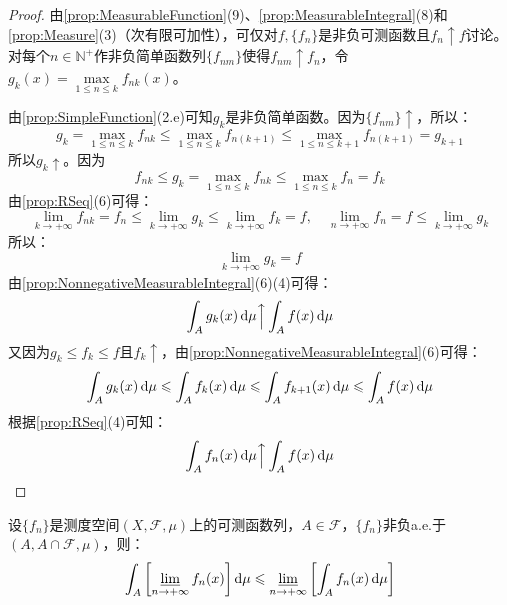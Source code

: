 \begin{proof}
	由\cref{prop:MeasurableFunction}(9)、\cref{prop:MeasurableIntegral}(8)和\cref{prop:Measure}(3)（次有限可加性），可仅对$f,\{f_n\}$是非负可测函数且$f_n\uparrow f$讨论。对每个$n\in\mathbb{N}^+$作非负简单函数列$\{f_{nm}\}$使得$f_{nm}\uparrow f_n$，令$g_k(x)=\max\limits_{1\leqslant n\leqslant k}f_{nk}(x)$。\par
	由\cref{prop:SimpleFunction}(2.e)可知$g_k$是非负简单函数。因为$\{f_{nm}\}\uparrow$，所以：
	\begin{equation*}
		g_k=\max_{1\leqslant n\leqslant k}f_{nk}\leqslant\max_{1\leqslant n\leqslant k}f_{n(k+1)}\leqslant\max_{1\leqslant n\leqslant k+1}f_{n(k+1)}=g_{k+1}
	\end{equation*}
	所以$g_k\uparrow$。因为
	\begin{equation*}
		f_{nk}\leqslant g_k=\max_{1\leqslant n\leqslant k}f_{nk}\leqslant\max_{1\leqslant n\leqslant k}f_n=f_k
	\end{equation*}
	由\cref{prop:RSeq}(6)可得：
	\begin{equation*}
		\lim_{k\to+\infty}f_{nk}=f_n\leqslant\lim_{k\to+\infty}g_k\leqslant\lim_{k\to+\infty}f_k=f,\quad\lim_{n\to+\infty}f_n=f\leqslant\lim_{k\to+\infty}g_k
	\end{equation*}
	所以：
	\begin{equation*}
		\lim_{k\to+\infty}g_k=f
	\end{equation*}
	由\cref{prop:NonnegativeMeasurableIntegral}(6)(4)可得：
	\begin{equation*}
		\int_{A}g_k(x)\mathop{}\!\mathrm{d}\mu\Big\uparrow\int_{A}f(x)\mathop{}\!\mathrm{d}\mu
	\end{equation*}
	又因为$g_k\leqslant f_k\leqslant f$且$f_k\uparrow$，由\cref{prop:NonnegativeMeasurableIntegral}(6)可得：
	\begin{equation*}
		\int_{A}g_k(x)\mathop{}\!\mathrm{d}\mu\leqslant\int_{A}f_k(x)\mathop{}\!\mathrm{d}\mu\leqslant\int_{A}f_{k+1}(x)\mathop{}\!\mathrm{d}\mu\leqslant\int_{A}f(x)\mathop{}\!\mathrm{d}\mu
	\end{equation*}
	根据\cref{prop:RSeq}(4)可知：
	\begin{equation*}
		\int_{A}f_n(x)\mathop{}\!\mathrm{d}\mu\Big\uparrow\int_{A}f(x)\mathop{}\!\mathrm{d}\mu\qedhere
	\end{equation*}
\end{proof}
\begin{theorem}\label{theo:FatouLemma}
	设$\{f_n\}$是测度空间$(X,\mathscr{F},\mu)$上的可测函数列，$A\in\mathscr{F}$，$\{f_n\}$非负a.e.于$(A,A\cap\mathscr{F},\mu)$，则：
	\begin{equation*}
		\int_{A}\left[\varliminf_{n\to+\infty}f_n(x)\right]\mathop{}\!\mathrm{d}\mu\leqslant\varliminf_{n\to+\infty}\left[\int_{A}f_n(x)\mathop{}\!\mathrm{d}\mu\right]
	\end{equation*}
\end{theorem}
